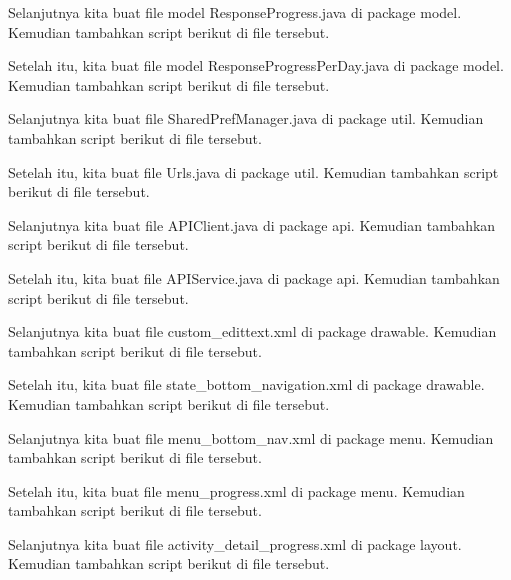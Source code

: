 Selanjutnya kita buat file model ResponseProgress.java di package model. Kemudian tambahkan script berikut di file tersebut.


Setelah itu, kita buat file model ResponseProgressPerDay.java di package model. Kemudian tambahkan script berikut di file tersebut.


Selanjutnya kita buat file SharedPrefManager.java di package util. Kemudian tambahkan script berikut di file tersebut.


Setelah itu, kita buat file Urls.java di package util. Kemudian tambahkan script berikut di file tersebut.


Selanjutnya kita buat file APIClient.java di package api. Kemudian tambahkan script berikut di file tersebut.


Setelah itu, kita buat file APIService.java di package api. Kemudian tambahkan script berikut di file tersebut.


Selanjutnya kita buat file custom\_edittext.xml di package drawable. Kemudian tambahkan script berikut di file tersebut.


Setelah itu, kita buat file state\_bottom\_navigation.xml di package drawable. Kemudian tambahkan script berikut di file tersebut.


Selanjutnya kita buat file menu\_bottom\_nav.xml di package menu. Kemudian tambahkan script berikut di file tersebut.


Setelah itu, kita buat file menu\_progress.xml di package menu. Kemudian tambahkan script berikut di file tersebut.


Selanjutnya kita buat file activity\_detail\_progress.xml di package layout. Kemudian tambahkan script berikut di file tersebut.


